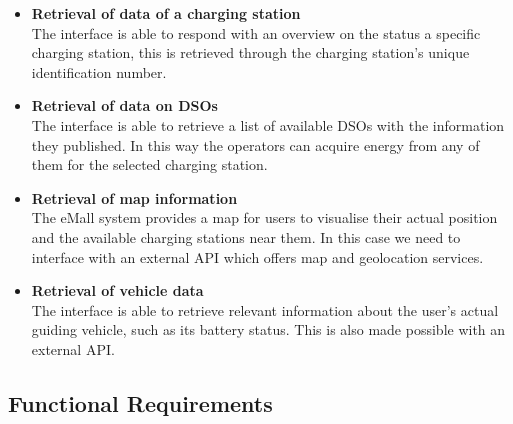\documentclass[../main.tex]{subfiles}
\begin{document}
\begin{itemize}
    \item \textbf{Retrieval of data of a charging station}\\
    The interface is able to respond with an overview on the status a specific charging station, this is retrieved through the charging station's unique identification number. 
    \item \textbf{Retrieval of data on DSOs}\\
    The interface is able to retrieve a list of available DSOs with the information they published. In this way the operators can acquire energy from any of them for the selected charging station. 
    \item \textbf{Retrieval of map information}\\
    The eMall system provides a map for users to visualise their actual position and the available charging stations near them. In this case we need to interface with an external API which offers map and geolocation services. 
    \item \textbf{Retrieval of vehicle data}\\
    The interface is able to retrieve relevant information about the user's actual guiding vehicle, such as its battery status. This is also made possible with an external API. 
    
\end{itemize}



\subsection{Functional Requirements}
\end{document}
